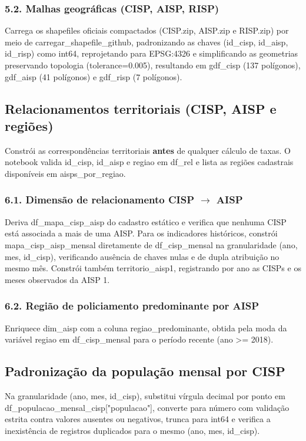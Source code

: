 \documentclass[11pt,a4paper]{article}
\newcommand{\code}[1]{{\ttfamily\footnotesize\allowbreak #1}}
\begin{document}
\subsubsection*{5.2. Malhas geográficas (CISP, AISP, RISP)}
Carrega os shapefiles oficiais compactados (\code{CISP.zip}, \code{AISP.zip} e \code{RISP.zip}) por meio de \code{carregar\_shapefile\_github}, padronizando as chaves (\code{id\_cisp}, \code{id\_aisp}, \code{id\_risp}) como \code{int64}, reprojetando para \code{EPSG:4326} e simplificando as geometrias preservando topologia (\code{tolerance=0.005}), resultando em \code{gdf\_cisp} (137 polígonos), \code{gdf\_aisp} (41 polígonos) e \code{gdf\_risp} (7 polígonos).

\subsection{Relacionamentos territoriais (CISP, AISP e regiões)}
Constrói as correspondências territoriais \textbf{antes} de qualquer cálculo de taxas. O notebook valida \code{id\_cisp}, \code{id\_aisp} e \code{regiao} em \code{df\_rel} e lista as regiões cadastrais disponíveis em \code{aisps\_por\_regiao}.

\subsubsection*{6.1. Dimensão de relacionamento CISP $\rightarrow$ AISP}
Deriva \code{df\_mapa\_cisp\_aisp} do cadastro estático e verifica que nenhuma CISP está associada a mais de uma AISP. Para os indicadores históricos, constrói \code{mapa\_cisp\_aisp\_mensal} diretamente de \code{df\_cisp\_mensal} na granularidade \code{(ano, mes, id\_cisp)}, verificando ausência de chaves nulas e de dupla atribuição no mesmo mês. Constrói também \code{territorio\_aisp1}, registrando por ano as CISPs e os meses observados da AISP 1.

\subsubsection*{6.2. Região de policiamento predominante por AISP}
Enriquece \code{dim\_aisp} com a coluna \code{regiao\_predominante}, obtida pela moda da variável \code{regiao} em \code{df\_cisp\_mensal} para o período recente (\code{ano >= 2018}).

\subsection{Padronização da população mensal por CISP}
Na granularidade \code{(ano, mes, id\_cisp)}, substitui vírgula decimal por ponto em \code{df\_populacao\_mensal\_cisp["populacao"]}, converte para número com validação estrita contra valores ausentes ou negativos, trunca para \code{int64} e verifica a inexistência de registros duplicados para o mesmo \code{(ano, mes, id\_cisp)}.
\end{document}
